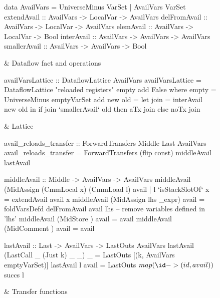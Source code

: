 \documentclass[blockstyle,preprint,nocopyrightspace]{sigplanconf}
\begin{document}
\begin{figure*}
\begin{codetable}
\T\begin{code}
data AvailVars = UniverseMinus VarSet
               | AvailVars     VarSet
extendAvail  :: AvailVars -> LocalVar  -> AvailVars
delFromAvail :: AvailVars -> LocalVar  -> AvailVars
elemAvail    :: AvailVars -> LocalVar  -> Bool
interAvail   :: AvailVars -> AvailVars -> AvailVars
smallerAvail :: AvailVars -> AvailVars -> Bool
\end{code}\B
& Dataflow fact and operations\\
\hline

\T\begin{code}
availVarsLattice :: DataflowLattice AvailVars
availVarsLattice = DataflowLattice "reloaded registers" empty add False
    where empty = UniverseMinus emptyVarSet
          add new old = let join = interAvail new old in
                        if join `smallerAvail` old then aTx join else noTx join
\end{code}\B
& Lattice\\
\hline

\T\begin{code}
avail_reloads_transfer :: ForwardTransfers Middle Last AvailVars
avail_reloads_transfer = ForwardTransfers (flip const) middleAvail lastAvail

middleAvail :: Middle -> AvailVars -> AvailVars
middleAvail (MidAssign (CmmLocal x) (CmmLoad l) avail
                 | l `isStackSlotOf` x = extendAvail avail x
middleAvail (MidAssign lhs _expr) avail = 
  foldVarsDefd delFromAvail avail lhs  -- remove variables defined in 'lhs'
middleAvail (MidStore {})         avail = avail
middleAvail (MidComment {})       avail = avail

lastAvail :: Last -> AvailVars -> LastOuts AvailVars
lastAvail (LastCall _ (Just k) _ _) _ = LastOuts [(k, AvailVars emptyVarSet)]
lastAvail l avail = LastOuts $ map (\id -> (id, avail)) $ succs l
\end{code}\B
& Transfer \mbox{functions}\\
\hline


\end{codetable}
\end{figure*}
\end{document}
